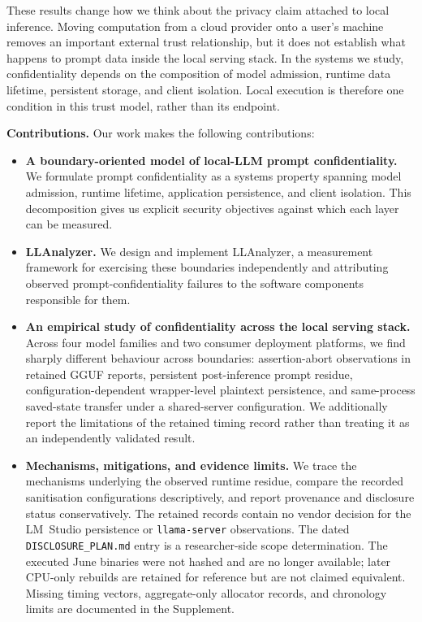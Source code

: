 \documentclass[journal,tifs]{IEEEtran}
\begin{document}
These results change how we think about the privacy claim attached to local inference. Moving computation from a cloud provider onto a user's machine removes an important external trust relationship, but it does not establish what happens to prompt data inside the local serving stack. In the systems we study, confidentiality depends on the composition of model admission, runtime data lifetime, persistent storage, and client isolation. Local execution is therefore one condition in this trust model, rather than its endpoint.

\textbf{Contributions.}
Our work makes the following contributions:

\begin{itemize}

\item \textbf{A boundary-oriented model of local-LLM prompt
confidentiality.}
We formulate prompt confidentiality as a systems property spanning model admission, runtime lifetime, application persistence, and client isolation. This decomposition gives us explicit security objectives against which each layer can be measured.

\item \textbf{LLAnalyzer.}
We design and implement LLAnalyzer, a measurement framework for exercising these boundaries independently and attributing observed prompt-confidentiality failures to the software components responsible for them.

\item \textbf{An empirical study of confidentiality across the local
serving stack.}
Across four model families and two consumer deployment platforms, we find sharply different behaviour across boundaries: assertion-abort observations in retained GGUF reports, persistent post-inference prompt residue, configuration-dependent wrapper-level plaintext persistence, and same-process saved-state transfer under a shared-server configuration. We additionally report the limitations of the retained timing record rather than treating it as an independently validated result.

\item \textbf{Mechanisms, mitigations, and evidence limits.}
We trace the mechanisms underlying the observed runtime residue, compare the recorded sanitisation configurations descriptively, and report provenance and disclosure status conservatively. The retained records contain no vendor decision for the LM~Studio persistence or \texttt{llama-server} observations. The dated \texttt{DISCLOSURE\_PLAN.md} entry is a researcher-side scope determination. The executed June binaries were not hashed and are no longer available; later CPU-only rebuilds are retained for reference but are not claimed equivalent. Missing timing vectors, aggregate-only allocator records, and chronology limits are documented in the Supplement.
\end{itemize}
\end{document}
